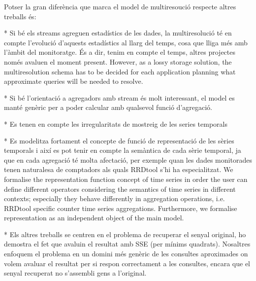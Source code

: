 



Potser la gran diferència que marca el model de multiresoució respecte altres treballs és:

* Si bé els streams agreguen estadístics de les dades, la multiresolució té en compte l'evolució d'aquests estadístics al llarg del temps, cosa que lliga més amb l'àmbit del monitoratge. És a dir, tenim en compte el temps, altres projectes només avaluen el moment present.  However, as a lossy storage solution, the
  multiresolution schema has to be decided for each application
  planning what approximate queries will be needed to resolve.

* Si bé l'orientació a agregadors amb stream és molt interessant, el model es manté genèric per a poder calcular amb qualsevol funció d'agregació.

* Es tenen en compte les irregularitats de mostreig de les series temporals

* Es modelitza fortament el concepte de funció de representació de les sèries temporals i així es pot tenir en compte la semàntica de cada sèrie temporal, ja que en cada agregació té molta afectació, per exemple quan les dades monitorades tenen naturalesa de comptadors als quals RRDtool s'hi ha especialitzat.
 We formalise the representation function concept of time series
  in order the user can define different operators considering the
  semantics of time series in different contexts; especially they
  behave differently in aggregation operations, i.e. RRDtool specific counter
  time series aggregations. Furthermore, we formalise representation
  as an independent object of the main model.

* Els altres treballs se centren en el problema de recuperar el senyal original, ho demostra el fet que avaluin el resultat amb SSE (per mínims quadrats). Nosaltres enfoquem el problema en un domini més genèric de les consultes aproximades on volem avaluar el resultat per si respon correctament a les consultes, encara que el senyal recuperat no s'assembli gens a l'original.

